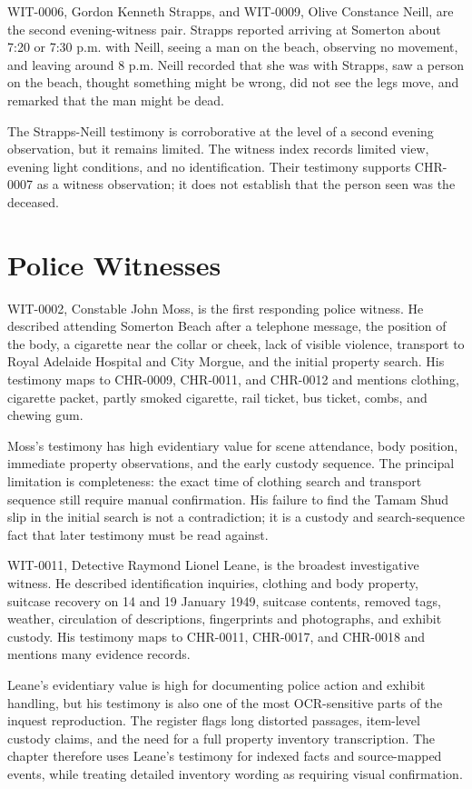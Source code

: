 WIT-0006, Gordon Kenneth Strapps, and WIT-0009, Olive Constance Neill, are the second evening-witness pair. Strapps reported arriving at Somerton about 7:20 or 7:30 p.m. with Neill, seeing a man on the beach, observing no movement, and leaving around 8 p.m. Neill recorded that she was with Strapps, saw a person on the beach, thought something might be wrong, did not see the legs move, and remarked that the man might be dead.

The Strapps-Neill testimony is corroborative at the level of a second evening observation, but it remains limited. The witness index records limited view, evening light conditions, and no identification. Their testimony supports CHR-0007 as a witness observation; it does not establish that the person seen was the deceased.

\section{Police Witnesses}

WIT-0002, Constable John Moss, is the first responding police witness. He described attending Somerton Beach after a telephone message, the position of the body, a cigarette near the collar or cheek, lack of visible violence, transport to Royal Adelaide Hospital and City Morgue, and the initial property search. His testimony maps to CHR-0009, CHR-0011, and CHR-0012 and mentions clothing, cigarette packet, partly smoked cigarette, rail ticket, bus ticket, combs, and chewing gum.

Moss's testimony has high evidentiary value for scene attendance, body position, immediate property observations, and the early custody sequence. The principal limitation is completeness: the exact time of clothing search and transport sequence still require manual confirmation. His failure to find the Tamam Shud slip in the initial search is not a contradiction; it is a custody and search-sequence fact that later testimony must be read against.

WIT-0011, Detective Raymond Lionel Leane, is the broadest investigative witness. He described identification inquiries, clothing and body property, suitcase recovery on 14 and 19 January 1949, suitcase contents, removed tags, weather, circulation of descriptions, fingerprints and photographs, and exhibit custody. His testimony maps to CHR-0011, CHR-0017, and CHR-0018 and mentions many evidence records.

Leane's evidentiary value is high for documenting police action and exhibit handling, but his testimony is also one of the most OCR-sensitive parts of the inquest reproduction. The register flags long distorted passages, item-level custody claims, and the need for a full property inventory transcription. The chapter therefore uses Leane's testimony for indexed facts and source-mapped events, while treating detailed inventory wording as requiring visual confirmation.

